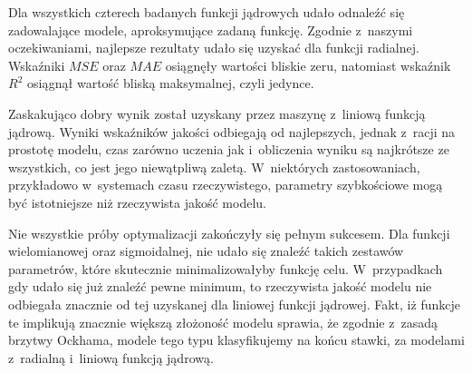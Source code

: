 \begin{table}[htb]
    \centering
    \caption{Wyniki procesu optymalizacji wskaźników jakości za pomocą algorytmu ewolucyjnego dla wielomianowej funkcji jądrowej}
    \label{tab:optim-poly}
\end{table}


Dla wszystkich czterech badanych funkcji jądrowych udało odnaleźć się zadowalające modele, aproksymujące zadaną funkcję. Zgodnie z~naszymi oczekiwaniami, najlepsze rezultaty udało się uzyskać dla funkcji radialnej. Wskaźniki $MSE$ oraz $MAE$ osiągnęły wartości bliskie zeru, natomiast wskaźnik $R^2$ osiągnął wartość bliską maksymalnej, czyli jedynce. 

Zaskakująco dobry wynik został uzyskany przez maszynę z~liniową funkcją jądrową. Wyniki wskaźników jakości odbiegają od najlepszych, jednak z~racji na prostotę modelu, czas zarówno uczenia jak i~obliczenia wyniku są najkrótsze ze wszystkich, co jest jego niewątpliwą zaletą. W~niektórych zastosowaniach, przykładowo w~systemach czasu rzeczywistego, parametry szybkościowe mogą być istotniejsze niż rzeczywista jakość modelu.

Nie wszystkie próby optymalizacji zakończyły się pełnym sukcesem. Dla funkcji wielomianowej oraz sigmoidalnej, nie udało się znaleźć takich zestawów parametrów, które skutecznie minimalizowałyby funkcję celu. W~przypadkach gdy udało się już znaleźć pewne minimum, to rzeczywista jakość modelu nie odbiegała znacznie od tej uzyskanej dla liniowej funkcji jądrowej. Fakt, iż funkcje te implikują znacznie większą złożoność modelu sprawia, że zgodnie z~zasadą brzytwy Ockhama, modele tego typu klasyfikujemy na końcu stawki, za modelami z~radialną i~liniową funkcją jądrową.